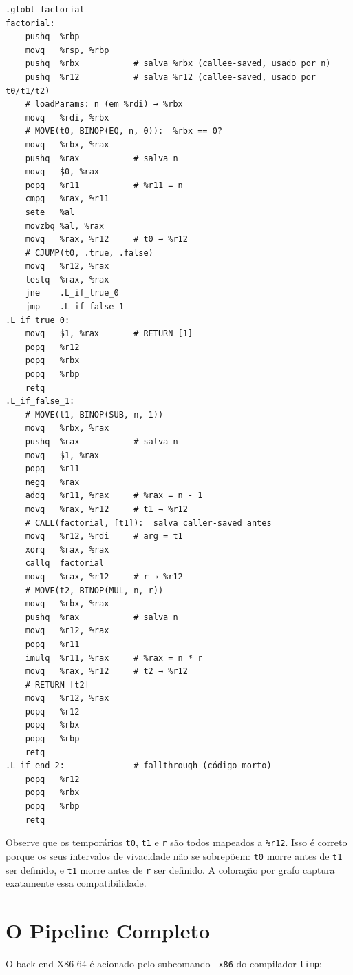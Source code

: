 \begin{verbatim}
.globl factorial
factorial:
    pushq  %rbp
    movq   %rsp, %rbp
    pushq  %rbx           # salva %rbx (callee-saved, usado por n)
    pushq  %r12           # salva %r12 (callee-saved, usado por t0/t1/t2)
    # loadParams: n (em %rdi) → %rbx
    movq   %rdi, %rbx
    # MOVE(t0, BINOP(EQ, n, 0)):  %rbx == 0?
    movq   %rbx, %rax
    pushq  %rax           # salva n
    movq   $0, %rax
    popq   %r11           # %r11 = n
    cmpq   %rax, %r11
    sete   %al
    movzbq %al, %rax
    movq   %rax, %r12     # t0 → %r12
    # CJUMP(t0, .true, .false)
    movq   %r12, %rax
    testq  %rax, %rax
    jne    .L_if_true_0
    jmp    .L_if_false_1
.L_if_true_0:
    movq   $1, %rax       # RETURN [1]
    popq   %r12
    popq   %rbx
    popq   %rbp
    retq
.L_if_false_1:
    # MOVE(t1, BINOP(SUB, n, 1))
    movq   %rbx, %rax
    pushq  %rax           # salva n
    movq   $1, %rax
    popq   %r11
    negq   %rax
    addq   %r11, %rax     # %rax = n - 1
    movq   %rax, %r12     # t1 → %r12
    # CALL(factorial, [t1]):  salva caller-saved antes
    movq   %r12, %rdi     # arg = t1
    xorq   %rax, %rax
    callq  factorial
    movq   %rax, %r12     # r → %r12
    # MOVE(t2, BINOP(MUL, n, r))
    movq   %rbx, %rax
    pushq  %rax           # salva n
    movq   %r12, %rax
    popq   %r11
    imulq  %r11, %rax     # %rax = n * r
    movq   %rax, %r12     # t2 → %r12
    # RETURN [t2]
    movq   %r12, %rax
    popq   %r12
    popq   %rbx
    popq   %rbp
    retq
.L_if_end_2:              # fallthrough (código morto)
    popq   %r12
    popq   %rbx
    popq   %rbp
    retq
\end{verbatim}

\begin{remark}
  Observe que os temporários \texttt{t0}, \texttt{t1} e \texttt{r} são
  todos mapeados a \texttt{\%r12}. Isso é correto porque os seus
  intervalos de vivacidade não se sobrepõem: \texttt{t0} morre antes de
  \texttt{t1} ser definido, e \texttt{t1} morre antes de \texttt{r} ser
  definido. A coloração por grafo captura exatamente essa compatibilidade.
\end{remark}

\section{O Pipeline Completo}

O back-end X86-64 é acionado pelo subcomando \texttt{--x86} do compilador
\texttt{timp}:

